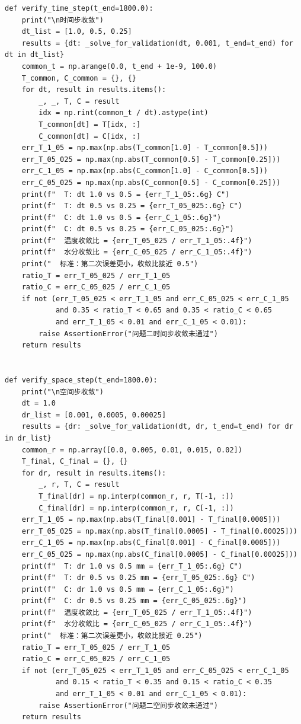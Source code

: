\documentclass[withoutpreface,bwprint]{cumcm_thesis}
\begin{document}
\begin{appendices}
\begin{lstlisting}
def verify_time_step(t_end=1800.0):
    print("\n时间步收敛")
    dt_list = [1.0, 0.5, 0.25]
    results = {dt: _solve_for_validation(dt, 0.001, t_end=t_end) for dt in dt_list}
    common_t = np.arange(0.0, t_end + 1e-9, 100.0)
    T_common, C_common = {}, {}
    for dt, result in results.items():
        _, _, T, C = result
        idx = np.rint(common_t / dt).astype(int)
        T_common[dt] = T[idx, :]
        C_common[dt] = C[idx, :]
    err_T_1_05 = np.max(np.abs(T_common[1.0] - T_common[0.5]))
    err_T_05_025 = np.max(np.abs(T_common[0.5] - T_common[0.25]))
    err_C_1_05 = np.max(np.abs(C_common[1.0] - C_common[0.5]))
    err_C_05_025 = np.max(np.abs(C_common[0.5] - C_common[0.25]))
    print(f"  T: dt 1.0 vs 0.5 = {err_T_1_05:.6g} C")
    print(f"  T: dt 0.5 vs 0.25 = {err_T_05_025:.6g} C")
    print(f"  C: dt 1.0 vs 0.5 = {err_C_1_05:.6g}")
    print(f"  C: dt 0.5 vs 0.25 = {err_C_05_025:.6g}")
    print(f"  温度收敛比 = {err_T_05_025 / err_T_1_05:.4f}")
    print(f"  水分收敛比 = {err_C_05_025 / err_C_1_05:.4f}")
    print("  标准：第二次误差更小，收敛比接近 0.5")
    ratio_T = err_T_05_025 / err_T_1_05
    ratio_C = err_C_05_025 / err_C_1_05
    if not (err_T_05_025 < err_T_1_05 and err_C_05_025 < err_C_1_05
            and 0.35 < ratio_T < 0.65 and 0.35 < ratio_C < 0.65
            and err_T_1_05 < 0.01 and err_C_1_05 < 0.01):
        raise AssertionError("问题二时间步收敛未通过")
    return results


def verify_space_step(t_end=1800.0):
    print("\n空间步收敛")
    dt = 1.0
    dr_list = [0.001, 0.0005, 0.00025]
    results = {dr: _solve_for_validation(dt, dr, t_end=t_end) for dr in dr_list}
    common_r = np.array([0.0, 0.005, 0.01, 0.015, 0.02])
    T_final, C_final = {}, {}
    for dr, result in results.items():
        _, r, T, C = result
        T_final[dr] = np.interp(common_r, r, T[-1, :])
        C_final[dr] = np.interp(common_r, r, C[-1, :])
    err_T_1_05 = np.max(np.abs(T_final[0.001] - T_final[0.0005]))
    err_T_05_025 = np.max(np.abs(T_final[0.0005] - T_final[0.00025]))
    err_C_1_05 = np.max(np.abs(C_final[0.001] - C_final[0.0005]))
    err_C_05_025 = np.max(np.abs(C_final[0.0005] - C_final[0.00025]))
    print(f"  T: dr 1.0 vs 0.5 mm = {err_T_1_05:.6g} C")
    print(f"  T: dr 0.5 vs 0.25 mm = {err_T_05_025:.6g} C")
    print(f"  C: dr 1.0 vs 0.5 mm = {err_C_1_05:.6g}")
    print(f"  C: dr 0.5 vs 0.25 mm = {err_C_05_025:.6g}")
    print(f"  温度收敛比 = {err_T_05_025 / err_T_1_05:.4f}")
    print(f"  水分收敛比 = {err_C_05_025 / err_C_1_05:.4f}")
    print("  标准：第二次误差更小，收敛比接近 0.25")
    ratio_T = err_T_05_025 / err_T_1_05
    ratio_C = err_C_05_025 / err_C_1_05
    if not (err_T_05_025 < err_T_1_05 and err_C_05_025 < err_C_1_05
            and 0.15 < ratio_T < 0.35 and 0.15 < ratio_C < 0.35
            and err_T_1_05 < 0.01 and err_C_1_05 < 0.01):
        raise AssertionError("问题二空间步收敛未通过")
    return results



\end{lstlisting}
\end{appendices}
\end{document}
